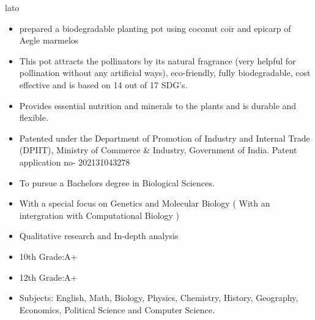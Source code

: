 {lato}\documentclass[10pt,a4paper,ragged2e]{altacv}
\begin{document}
{{        \divider

        \begin{itemize}
            \item prepared a biodegradable planting pot using coconut coir and epicarp of Aegle marmelos 
            \item This pot attracts the pollinators by its natural fragrance (very helpful for pollination without any artificial ways), eco-friendly, fully biodegradable, cost effective and is based on 14 out of 17 SDG’s.
            \item Provides essential nutrition and minerals to the plants and is durable and flexible.
            \item Patented under the Department of Promotion of Industry and Internal Trade (DPIIT), Ministry of Commerce & Industry, Government of India. Patent application no- 202131043278
        \end{itemize}


        \begin{itemize}

        \end{itemize}

    }
}


\begin{itemize}
    \item To pursue a Bachelors degree in Biological Sciences.
    \item With a special focus on Genetics and Molecular Biology ( With an intergration with Computational Biology )
    \item Qualitative research and In-depth analysis 
\end{itemize}
\divider

\begin{itemize}
    \item 10th Grade:A+
    \item 12th Grade:A+
    \item Subjects: English, Math, Biology, Physics, Chemistry, History, Geography, Economics, Political Science and Computer Science.
\end{itemize}
\end{document}
